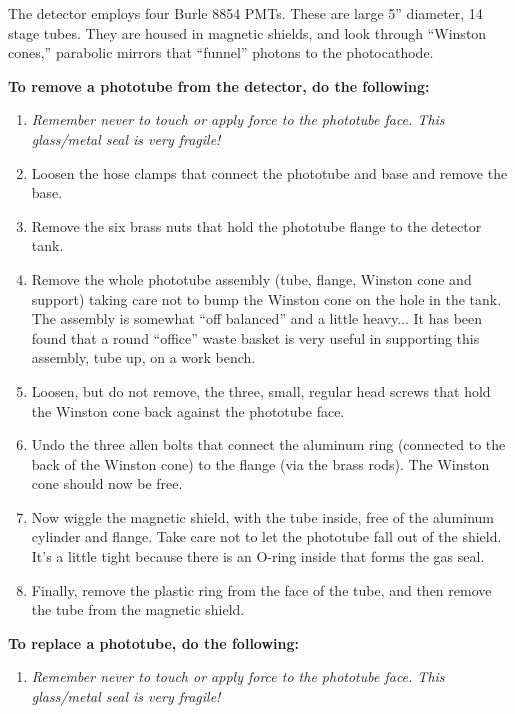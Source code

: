 \begin{obsolete}
	The detector employs four Burle 8854 PMTs.  These are large
5'' diameter, 14 stage tubes.  They are housed in magnetic shields,
and look through ``Winston cones,'' parabolic mirrors that ``funnel''
photons to the photocathode.

	{\bf To remove a phototube from the detector, do the following:}

\begin{enumerate}
\item {\em Remember never to touch or apply force to the phototube face.  This
glass/metal seal is very fragile!}

\item  Loosen the hose clamps that connect the phototube and base and remove
the base.

\item  Remove the six brass nuts that hold the phototube flange to the
detector tank.

\item  Remove the whole phototube assembly (tube, flange, Winston cone and
support) taking care not to bump the Winston cone on the hole in the
tank.  The assembly is somewhat ``off balanced'' and a little heavy...  It
has been found that a round ``office'' waste basket is very useful in
supporting this assembly, tube up, on a work bench.

\item  Loosen, but do not remove, the three, small, regular head screws
that hold the Winston cone back against the phototube face.

\item Undo the three allen bolts that connect the aluminum ring (connected
to the back of the Winston cone) to the flange (via the brass rods).
The Winston cone should now be free.

\item Now wiggle the magnetic shield, with the tube inside, free of the
aluminum cylinder and flange.  Take care not to let the phototube fall
out of the shield.  It's a little tight because there is an
O-ring inside that forms the gas seal.

\item  Finally, remove the plastic ring from the face of the tube, and then
remove the tube from the magnetic shield.
\end{enumerate}

	{\bf To replace a phototube, do the following:}
\begin{enumerate}

\item  {\em Remember never to touch or apply force to the phototube face.  This
glass/metal seal is very fragile!}


\end{enumerate}
\end{obsolete}
